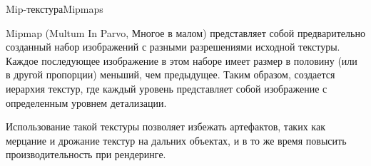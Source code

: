 \documentclass{beamer}
\begin{document}
	\begin{frame}{Mip-текстура}{Mipmaps}
		
		Mipmap (Multum In Parvo, Многое в малом) представляет собой предварительно созданный набор изображений с разными разрешениями исходной текстуры. Каждое последующее изображение в этом наборе имеет размер в половину (или в другой пропорции) меньший, чем предыдущее. Таким образом, создается иерархия текстур, где каждый уровень представляет собой изображение с определенным уровнем детализации.

		Использование такой текстуры позволяет избежать артефактов, таких как мерцание и дрожание текстур на дальних объектах, и в то же время повысить производительность при рендеринге.



	\end{frame}
\end{document}
